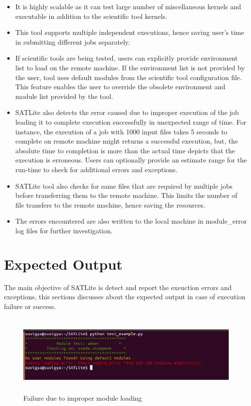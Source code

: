 \documentclass[10pt]{ruthesis}
\begin{document}
\begin{itemize}
\item It is highly scalable as it can test large number of miscellaneous kernels and executable in addition to the scientific tool kernels.
\item This tool supports multiple independent executions, hence saving user's time in submitting different jobs separately.  
\item If scientific tools are being tested, users can explicitly provide environment list to load on the remote machine. If the environment list is not provided by the user, tool uses default modules from the scientific tool configuration file. This feature enables the user to override the obsolete environment and module list provided by the tool.
\item SATLite also detects the error caused due to improper execution of the job leading it to complete execution successfully in unexpected range of time. For instance, the execution of a job with 1000 input files takes 5 seconds to complete on remote machine might returns a successful execution, but, the absolute time to completion is more than the actual time depicts that the execution is erroneous. Users can optionally provide an estimate range for the run-time to check for additional errors and exceptions.
\item SATLite tool also checks for same files that are required by multiple jobs before transferring them to the remote machine. This limits the number of file transfers to the remote machine, hence saving the resources. 
\item The errors encountered are also written to the local machine in module\_error log files for further investigation.
\end{itemize}

\section{Expected Output}
The main objective of SATLite is detect and report the exeuction errors and exceptions, this sections discusses about the expected output in case of execution failure or success.

\begin{figure}
  \begin{center}
  \includegraphics[width=16cm,height=4cm]{module_fail.png}
  \caption{Failure due to improper module loading}
  \label{fig:modfail}
  \end{center}
\end{figure}
\end{document}
